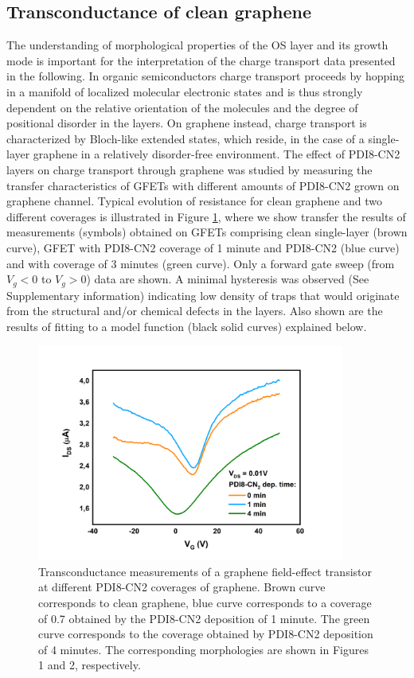 \documentclass[preprint,aip,jap]{revtex4-2}
\begin{document}
\subsection{Transconductance of clean graphene}
\label{sec:clean}

The understanding of morphological properties of the OS layer and its growth mode is important for the interpretation of the charge transport data presented in the following.  In organic semiconductors charge transport proceeds by hopping in a manifold of localized molecular electronic states and is thus strongly dependent on the relative orientation of the molecules and the degree of positional disorder in the layers.  On graphene instead, charge transport is characterized by Bloch-like extended states, which reside, in the case of a single-layer graphene in a relatively disorder-free environment.  The effect of PDI8-CN2 layers on charge transport through graphene was studied by measuring the transfer characteristics of GFETs with different amounts of PDI8-CN2 grown on graphene channel. Typical evolution of resistance for clean graphene and  two different coverages is illustrated in Figure \ref{fig:3}, where we show transfer the results of measurements (symbols) obtained on GFETs comprising clean single-layer (brown curve), GFET with PDI8-CN2 coverage of 1 minute and PDI8-CN2 (blue curve) and with coverage of 3 minutes (green curve).  Only a forward gate sweep (from $V_g<0$ to $V_g>0$) data are shown. A minimal hysteresis was observed (See Supplementary information) indicating low density of traps that would originate from the structural and/or chemical defects in the layers. Also shown are the results of fitting to a model function (black solid curves) explained below.

\begin{figure}[htb]
  \centering
   \includegraphics[width=0.9\textwidth]{./Figures/fig3}  
  \caption{Transconductance measurements of a graphene field-effect transistor at different PDI8-CN2 coverages of graphene. Brown curve corresponds to clean graphene, blue curve corresponds to a coverage of 0.7 obtained by the PDI8-CN2 deposition of 1 minute. The green curve corresponds to the coverage obtained by PDI8-CN2 deposition of 4 minutes. The corresponding morphologies are shown in Figures 1 and 2, respectively. }
  \label{fig:3}
\end{figure}
\end{document}
